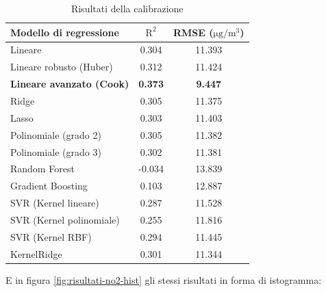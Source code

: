 \begin{table}[H]
    \footnotesize
    \centering
    \def\arraystretch{0.9}
    \begin{tabular}{|l|c|c|}
    \hline
        \textbf{Modello di regressione} & $\bm{\mathrm{R^2}}$ & \textbf{RMSE (}$\mathrm{\si{\micro}g/m^3}$) \\ \hline
        Lineare & 0.304 & 11.393 \\ \hline
        Lineare robusto (Huber) & 0.312 & 11.424 \\ \hline
        \textbf{Lineare avanzato (Cook)} & \textbf{0.373} & \textbf{9.447} \\ \hline
        Ridge & 0.305 & 11.375 \\ \hline
        Lasso & 0.303 & 11.403 \\ \hline
        Polinomiale (grado 2) & 0.305 & 11.382 \\ \hline
        Polinomiale (grado 3) & 0.302 & 11.381 \\ \hline
        Random Forest & -0.034 & 13.839 \\ \hline
        Gradient Boosting & 0.103 & 12.887 \\ \hline
        SVR (Kernel lineare) & 0.287 & 11.528 \\ \hline
        SVR (Kernel polinomiale) & 0.255 & 11.816 \\ \hline
        SVR (Kernel RBF) & 0.294 & 11.445 \\ \hline
        KernelRidge & 0.301 & 11.344 \\ \hline
    \end{tabular}
    \captionsetup{justification=centering}
    \caption{Risultati della calibrazione }
    \label{fig:risultati-no2}
\end{table}

E in figura \ref{fig:risultati-no2-hist} gli stessi risultati in forma di istogramma:

